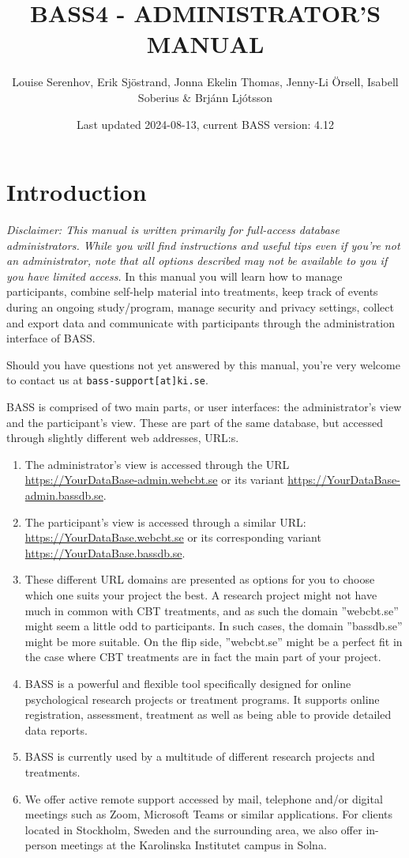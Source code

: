 \documentclass[
]{book}
\title{BASS4 - ADMINISTRATOR'S MANUAL}
\author{Louise Serenhov, Erik Sjöstrand, Jonna Ekelin Thomas, Jenny-Li Örsell, Isabell Soberius \& Brjánn Ljótsson}
\date{Last updated 2024-08-13, current BASS version: 4.12}
\providecommand{\tightlist}{%
  \setlength{\itemsep}{0pt}\setlength{\parskip}{0pt}}
\begin{document}
\maketitle

{
\setcounter{tocdepth}{1}
\tableofcontents
}
\chapter{Introduction}\label{introduction}

\emph{Disclaimer: This manual is written primarily for full-access database administrators. While you will find instructions and useful tips even if you're not an administrator, note that all options described may not be available to you if you have limited access.}
In this manual you will learn how to manage participants, combine self-help material into treatments, keep track of events during an ongoing study/program, manage security and privacy settings, collect and export data and communicate with participants through the administration interface of BASS.

Should you have questions not yet answered by this manual, you're very welcome to contact us at \texttt{bass-support{[}at{]}ki.se}.

BASS is comprised of two main parts, or user interfaces: the administrator's view and the participant's view. These are part of the same database, but accessed through slightly different web addresses, URL:s.

\begin{enumerate}
\def\labelenumi{\arabic{enumi}.}
\tightlist
\item
  The administrator's view is accessed through the URL \url{https://YourDataBase-admin.webcbt.se} or its variant \url{https://YourDataBase-admin.bassdb.se}.
\item
  The participant's view is accessed through a similar URL: \url{https://YourDataBase.webcbt.se} or its corresponding variant \url{https://YourDataBase.bassdb.se}.
\item
  These different URL domains are presented as options for you to choose which one suits your project the best. A research project might not have much in common with CBT treatments, and as such the domain ''webcbt.se'' might seem a little odd to participants. In such cases, the domain ''bassdb.se'' might be more suitable. On the flip side, ''webcbt.se'' might be a perfect fit in the case where CBT treatments are in fact the main part of your project.
\item
  BASS is a powerful and flexible tool specifically designed for online psychological research projects or treatment programs. It supports online registration, assessment, treatment as well as being able to provide detailed data reports.
\item
  BASS is currently used by a multitude of different research projects and treatments.
\item
  We offer active remote support accessed by mail, telephone and/or digital meetings such as Zoom, Microsoft Teams or similar applications. For clients located in Stockholm, Sweden and the surrounding area, we also offer in-person meetings at the Karolinska Institutet campus in Solna.
\end{enumerate}
\end{document}
